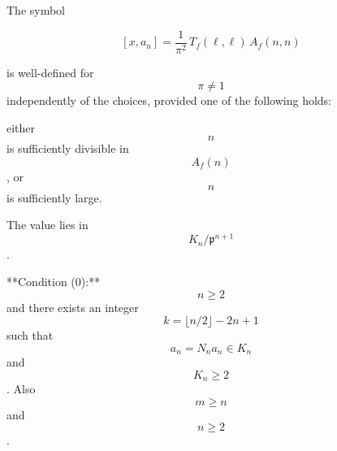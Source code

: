 The symbol

$$[x, a_n] = \frac{1}{\pi^2} \, T_f(\ell, \ell) \, A_f(n, n)$$

is well-defined for $$\pi \neq 1$$ independently of the choices, provided one of the following holds:

either $$n$$ is sufficiently divisible in $$A_f(n)$$, or $$n$$ is sufficiently large.

The value lies in $$K_n / \mathfrak{p}^{n+1}$$.

**Condition (0):** $$n \geq 2$$ and there exists an integer $$k = \lfloor n/2 \rfloor - 2n + 1$$ such that $$a_n = N_n a_n \in K_n$$ and $$K_n \geq 2$$. Also $$m \geq n$$ and $$n \geq 2$$.
